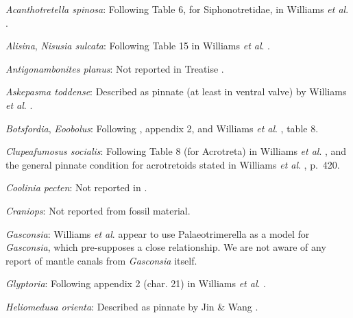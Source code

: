 \documentclass[openany]{book}
\theoremstyle{definition}
\theoremstyle{definition}
\theoremstyle{definition}
\theoremstyle{remark}
\begin{document}
\hypertarget{Acanthotretella_spinosa-coding-174}{}
\emph{Acanthotretella spinosa}: Following Table 6, for Siphonotretidae,
in Williams \emph{et al}.
\citeyearpar{Williams2000LinguliformeaCraniiformea}.

\hypertarget{Alisina-coding-174}{}
\emph{Alisina}, \emph{Nisusia sulcata}: Following Table 15 in Williams
\emph{et al}. \citeyearpar{Williams2000LinguliformeaCraniiformea}.

\hypertarget{Antigonambonites_planus-coding-174}{}
\emph{Antigonambonites planus}: Not reported in Treatise
\citep{Williams2000LinguliformeaCraniiformea}.

\hypertarget{Askepasma_toddense-coding-174}{}
\emph{Askepasma toddense}: Described as pinnate (at least in ventral
valve) by Williams \emph{et al}.
\citeyearpar[p.~250]{Williams1998Thediversity}.

\hypertarget{Botsfordia-coding-174}{}
\emph{Botsfordia}, \emph{Eoobolus}: Following
\citet{Williams1998Thediversity}, appendix 2, and Williams \emph{et al}.
\citeyearpar{Williams2000LinguliformeaCraniiformea}, table 8.

\hypertarget{Clupeafumosus_socialis-coding-174}{}
\emph{Clupeafumosus socialis}: Following Table 8 (for Acrotreta) in
Williams \emph{et al}.
\citeyearpar{Williams2000LinguliformeaCraniiformea}, and the general
pinnate condition for acrotretoids stated in Williams \emph{et al}.
\citeyearpar{Williams1997Introduction}, p.~420.

\hypertarget{Coolinia_pecten-coding-174}{}
\emph{Coolinia pecten}: Not reported in
\citet{Williams2000LinguliformeaCraniiformea}.

\hypertarget{Craniops-coding-174}{}
\emph{Craniops}: Not reported from fossil material.

\hypertarget{Gasconsia-coding-174}{}
\emph{Gasconsia}: Williams \emph{et al}. \citeyearpar[table
15]{Williams2000LinguliformeaCraniiformea} appear to use
Palaeotrimerella \citep[as drawn in][]{Williams1997Introduction} as a
model for \emph{Gasconsia}, which pre-supposes a close relationship. We
are not aware of any report of mantle canals from \emph{Gasconsia}
itself.

\hypertarget{Glyptoria-coding-174}{}
\emph{Glyptoria}: Following appendix 2 (char. 21) in Williams \emph{et
al}. \citeyearpar{Williams1998Thediversity}.

\hypertarget{Heliomedusa_orienta-coding-174}{}
\emph{Heliomedusa orienta}: Described as pinnate by Jin \& Wang
\citeyearpar{Jin1992Revisionof}.
\end{document}
